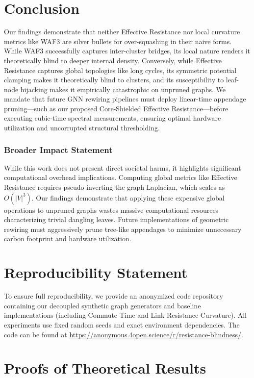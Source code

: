 \documentclass[10pt]{article} %
\begin{document}
\section{Conclusion}
Our findings demonstrate that neither Effective Resistance nor local curvature metrics like WAF3 are silver bullets for over-squashing in their naive forms. While WAF3 successfully captures inter-cluster bridges, its local nature renders it theoretically blind to deeper internal density. Conversely, while Effective Resistance captures global topologies like long cycles, its symmetric potential clamping makes it theoretically blind to clusters, and its susceptibility to leaf-node hijacking makes it empirically catastrophic on unpruned graphs. We mandate that future GNN rewiring pipelines must deploy linear-time appendage pruning---such as our proposed Core-Shielded Effective Resistance---before executing cubic-time spectral measurements, ensuring optimal hardware utilization and uncorrupted structural thresholding. 

\subsubsection*{Broader Impact Statement}
While this work does not present direct societal harms, it highlights significant computational overhead implications. Computing global metrics like Effective Resistance requires pseudo-inverting the graph Laplacian, which scales as $O(|V|^3)$. Our findings demonstrate that applying these expensive global operations to unpruned graphs wastes massive computational resources characterizing trivial dangling leaves. Future implementations of geometric rewiring must aggressively prune tree-like appendages to minimize unnecessary carbon footprint and hardware utilization.

\section{Reproducibility Statement}
To ensure full reproducibility, we provide an anonymized code repository containing our decoupled synthetic graph generators and baseline implementations (including Commute Time and Link Resistance Curvature). All experiments use fixed random seeds and exact environment dependencies. The code can be found at \url{https://anonymous.4open.science/r/resistance-blindness/}.




\appendix
\section{Proofs of Theoretical Results}
\label{app:proofs}
\end{document}
